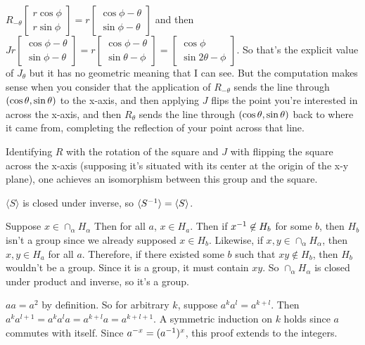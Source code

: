 \documentclass[11pt, oneside]{article}   	%
\begin{document}
\item $R_{-\theta} \left[ \begin{array}{c} r\cos\phi \\ r\sin\phi \end{array} \right] = r \left[ \begin{array}{c} \cos{\phi - \theta} \\ \sin{\phi - \theta} \end{array} \right]$ and then $Jr\left[ \begin{array}{c} \cos{\phi - \theta} \\ \sin{\phi - \theta} \end{array} \right] = r\left[ \begin{array}{c} \cos{\phi - \theta} \\ \sin{\theta - \phi} \end{array} \right] = \left[ \begin{array}{c} \cos{\phi} \\ \sin{2\theta - \phi} \end{array} \right]$. So that's the explicit value of $J_\theta$ but it has no geometric meaning that I can see. But the computation makes sense when you consider that the application of $R_{-\theta}$ sends the line through $(\cos\theta, \sin\theta)$ to the x-axis, and then applying $J$ flips the point you're interested in across the x-axis, and then $R_\theta$ sends the line through $(\cos\theta, \sin\theta)$ back to where it came from, completing the reflection of your point across that line.
\item Identifying $R$ with the rotation of the square and $J$ with flipping the square across the x-axis (supposing it's situated with its center at the origin of the x-y plane), one achieves an isomorphism between this group and the square.
\ee
\item $\langle S \rangle$ is closed under inverse, so $\langle S^{-1} \rangle = \langle S \rangle$. 
\item Suppose $x \in \cap_\alpha H_\alpha$ Then for all $a$, $x\in H_a$. Then if $x^{-1} \not \in H_b$ for some $b$, then $H_b$ isn't a group since we already supposed $x \in H_b$. Likewise, if $x, y \in \cap_\alpha H_\alpha$, then $x, y \in H_a$ for all $a$. Therefore, if there existed some $b$ such that $xy \not \in H_b$, then $H_b$ wouldn't be a group. Since it is a group, it must contain $xy$. So $\cap_\alpha H_\alpha$ is closed under product and inverse, so it's a group.
\item \be
\item $aa = a^2$ by definition. So for arbitrary $k$, suppose $a^ka^l = a^{k + l}$. Then $a^ka^{l+1} = a^ka^la = a^{k+l}a = a^{k+l+1}$. A symmetric induction on $k$ holds since $a$ commutes with itself. Since $a^{-x} = (a^{-1})^x$, this proof extends to the integers.
\end{document}
